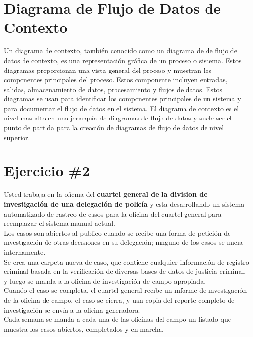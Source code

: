 \documentclass[12pt]{article}
\begin{document}
\section{Diagrama de Flujo de Datos de Contexto}
  Un diagrama de contexto, también conocido como un diagrama de de flujo de datos de contexto, es una representación gráfica de un proceso o sistema. Estos diagramas proporcionan una vista general del proceso y muestran los componentes principales del proceso. Estos componente incluyen entradas, salidas, almacenamiento de datos, procesamiento y flujos de datos. Estos diagramas se usan para identificar los componentes principales de un sistema y para documentar el flujo de datos en el sistema. El diagrama de contexto es el nivel mas alto en una jerarquía de diagramas de flujo de datos y suele ser el punto de partida para la creación de diagramas de flujo de datos de nivel superior.

\section{Ejercicio \#2}

Usted trabaja en la oficina del \textbf{cuartel general de la division de investigación de una delegación de policía} y esta desarrollando un sistema automatizado de rastreo de casos para la oficina del cuartel general para reemplazar el sistema manual actual.\\

Los casos son abiertos al publico cuando se recibe una forma de petición de investigación de otras decisiones en su delegación; ninguno de los casos se inicia internamente.\\

Se crea una carpeta nueva de caso, que contiene cualquier información de registro criminal basada en la verificación de diversas bases de datos de justicia criminal, y luego se manda a la oficina de investigación de campo apropiada.\\

Cuando el caso se completa, el cuartel general recibe un informe de investigación de la oficina de campo, el caso se cierra, y uan copia del reporte completo de investigación se envía a la oficina generadora.\\

Cada semana se manda a cada una de las oficinas del campo un listado que muestra los casos abiertos, completados y en marcha.\\
\end{document}
